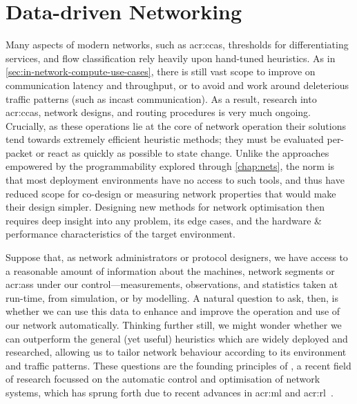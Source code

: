 \chapter{Data-driven Networking}\label{chap:ddn}
Many aspects of modern networks, such as \glspl{acr:cca}, thresholds for differentiating services, and flow classification rely heavily upon hand-tuned heuristics.
As in \cref{sec:in-network-compute-use-cases}, there is still vast scope to improve on communication latency and throughput, or to avoid and work around deleterious traffic patterns (such as incast communication).
As a result, research into \glspl{acr:cca}, network designs, and routing procedures is very much ongoing.
Crucially, as these operations lie at the core of network operation their solutions tend towards extremely efficient heuristic methods; they must be evaluated per-packet or react as quickly as possible to state change.
Unlike the approaches empowered by the programmability explored through \cref{chap:nets}, the norm is that most deployment environments have no access to such tools, and thus have reduced scope for co-design or measuring network properties that would make their design simpler.
Designing new methods for network optimisation then requires deep insight into any problem, its edge cases, and the hardware \& performance characteristics of the target environment.

Suppose that, as network administrators or protocol designers, we have access to a reasonable amount of information about the machines, network segments or \glspl{acr:as} under our control---measurements, observations, and statistics taken at run-time, from simulation, or by modelling.
A natural question to ask, then, is whether we can use this data to enhance and improve the operation and use of our network automatically.
Thinking further still, we might wonder whether we can outperform the general (yet useful) heuristics which are widely deployed and researched, allowing us to tailor network behaviour according to its environment and traffic patterns.
These questions are the founding principles of , a recent field of research focussed on the automatic control and optimisation of network systems, which has sprung forth due to recent advances in \gls{acr:ml} and \gls{acr:rl}~\parencite{DBLP:conf/anrw/FeamsterR18,DBLP:journals/pieee/KellererKBBR019}.

